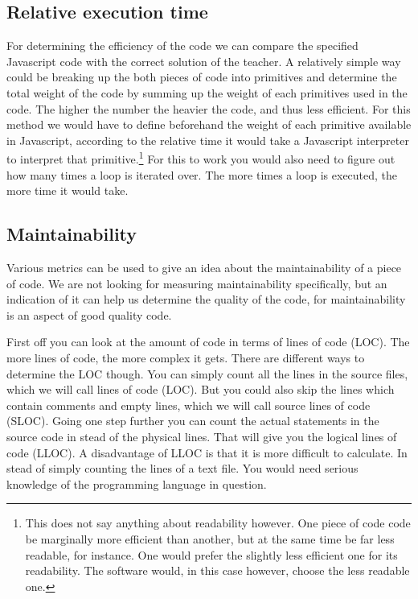 \documentclass{article}
\begin{document}
\subsection{Relative execution time}

For determining the efficiency of the code we can compare the specified
Javascript code with the correct solution of the teacher. A relatively simple
way could be breaking up the both pieces of code into primitives and determine
the total weight of the code by summing up the weight of each primitives used
in the code. The higher the number the heavier the code, and thus less
efficient. For this method we would have to define beforehand the weight of
each primitive available in Javascript, according to the relative time it would
take a Javascript interpreter to interpret that primitive.\footnote{This does
not say anything about readability however. One piece of code code be
marginally more efficient than another, but at the same time be far less
readable, for instance. One would prefer the slightly less efficient one for
its readability. The software would, in this case however, choose the less
readable one.} For this to work you would also need to figure out how many
times a loop is iterated over. The more times a loop is executed, the more time
it would take.

\subsection{Maintainability}

Various metrics can be used to give an idea about the maintainability of a
piece of code. We are not looking for measuring maintainability specifically,
but an indication of it can help us determine the quality of the code, for
maintainability is an aspect of good quality code.

First off you can look at the amount of code in terms of lines of code
(LOC). The more lines of code, the more complex it gets. There are different
ways to determine the LOC though. You can simply count all the lines in the
source files, which we will call lines of code (LOC). But you could also skip
the lines which contain comments and empty lines, which we will call source
lines of code (SLOC). Going one step further you can count the actual
statements in the source code in stead of the physical lines. That will give
you the logical lines of code (LLOC). A disadvantage of LLOC is that it is more
difficult to calculate. In stead of simply counting the lines of a text
file. You would need serious knowledge of the programming language in question.
\end{document}
